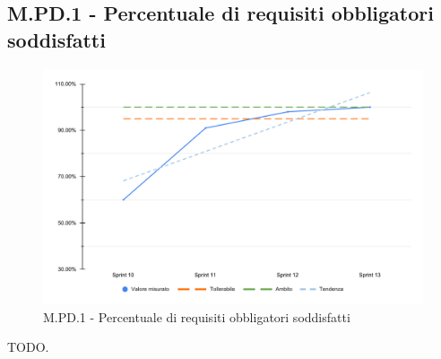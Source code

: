 \subsection{M.PD.1 - Percentuale di requisiti obbligatori soddisfatti}

\begin{figure}[H]
    \centering
    \includegraphics[width=\textwidth]{assets/requisiti_obbligatori_soddisfatti.pdf}
    \caption{M.PD.1 - Percentuale di requisiti obbligatori soddisfatti}
\end{figure}

\par TODO.